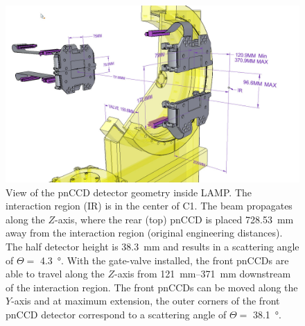 \begin{figure}
	\centering
		\includegraphics[width=1.0\textwidth]{images/pnCCD-dimensions.jpg}
	\caption[pnCCD detector geometry in the LAMP instrument.]{View of the pnCCD detector geometry inside LAMP. The interaction region (IR) is in the center of C1. The beam propagates along the $Z$-axis, where the rear (top) pnCCD is placed \SI{728.53}{\milli\meter} away from the interaction region (original engineering distances). The half detector height is \SI{38.3}{\milli\meter} and results in a scattering angle of $\Theta =$ \SI{4.3}{\degree}. With the gate-valve installed, the front pnCCDs are able to travel along the $Z$-axis from \SIrange{121}{371}{\milli\meter} downstream of the interaction region. The front pnCCDs can be moved along the $Y$-axis and at maximum extension, the outer corners of the front pnCCD detector correspond to a scattering angle of $\Theta=$ \SI{38.1}{\degree}.}
	\label{fig:pnCCD-dimensions}
\end{figure}
%
